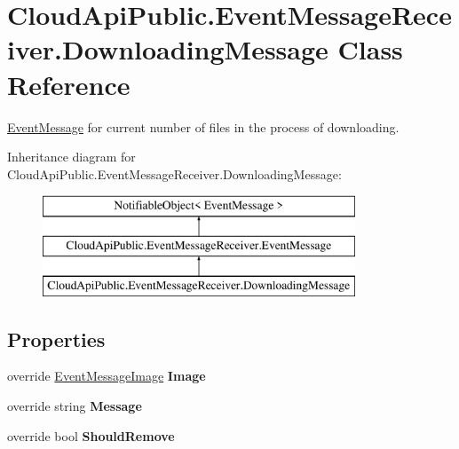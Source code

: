\hypertarget{class_cloud_api_public_1_1_event_message_receiver_1_1_downloading_message}{\section{Cloud\-Api\-Public.\-Event\-Message\-Receiver.\-Downloading\-Message Class Reference}
\label{class_cloud_api_public_1_1_event_message_receiver_1_1_downloading_message}
}


\hyperlink{class_cloud_api_public_1_1_event_message_receiver_1_1_event_message}{Event\-Message} for current number of files in the process of downloading.  


Inheritance diagram for Cloud\-Api\-Public.\-Event\-Message\-Receiver.\-Downloading\-Message\-:\begin{figure}[H]
\begin{center}
\leavevmode
\includegraphics[height=3.000000cm]{class_cloud_api_public_1_1_event_message_receiver_1_1_downloading_message}
\end{center}
\end{figure}
\subsection*{Properties}
\begin{DoxyCompactItemize}
\item 
\hypertarget{class_cloud_api_public_1_1_event_message_receiver_1_1_downloading_message_a671a0306f7eaea89889ff83e2eeb9dee}{override \hyperlink{namespace_cloud_api_public_1_1_static_aefcc1e7e1c81366ec3f6affd41c1f817}{Event\-Message\-Image} {\bfseries Image}}\label{class_cloud_api_public_1_1_event_message_receiver_1_1_downloading_message_a671a0306f7eaea89889ff83e2eeb9dee}

\item 
\hypertarget{class_cloud_api_public_1_1_event_message_receiver_1_1_downloading_message_a7a190dadcbff43246515dae3293854ed}{override string {\bfseries Message}}\label{class_cloud_api_public_1_1_event_message_receiver_1_1_downloading_message_a7a190dadcbff43246515dae3293854ed}

\item 
\hypertarget{class_cloud_api_public_1_1_event_message_receiver_1_1_downloading_message_abc8f37b597879baf61b6d10801e67e3f}{override bool {\bfseries Should\-Remove}}\label{class_cloud_api_public_1_1_event_message_receiver_1_1_downloading_message_abc8f37b597879baf61b6d10801e67e3f}

\end{DoxyCompactItemize}
